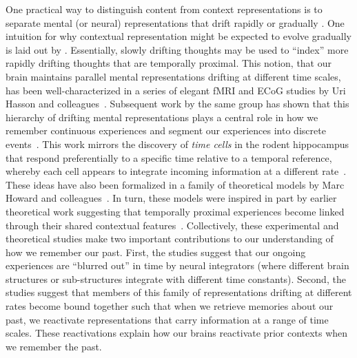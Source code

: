 \documentclass{article}
\begin{document}
One practical way to distinguish content from context representations is to separate mental (or neural) representations that drift rapidly \citep[content;][]{PolyEtal05, MannEtal12} or gradually \citep[context;][]{PolyEtal05, MannEtal11, HowaEtal12, FolkEtal18}.  One intuition for why contextual representation might be expected to evolve gradually is laid out by \cite{PolyKaha08}.  Essentially, slowly drifting thoughts may be used to ``index'' more rapidly drifting thoughts that are temporally proximal.  This notion, that our brain maintains parallel mental representations drifting at different time scales, has been well-characterized in a series of elegant fMRI and ECoG studies by Uri Hasson and colleagues~\citep{HassEtal08, LernEtal11, HoneEtal12}.  Subsequent work by the same group has shown that this hierarchy of drifting mental representations plays a central role in how we remember continuous experiences and segment our experiences into discrete events~\citep{BaldEtal17}. This work mirrors the discovery of \textit{time cells} in the rodent hippocampus that respond preferentially to a specific time relative to a temporal reference, whereby each cell appears to integrate incoming information at a different rate~\citep{PastEtal08, MacDEtal11}. These ideas have also been formalized in a family of theoretical models by Marc Howard and colleagues~\citep{HowaKaha02, SedeEtal08, PolyEtal09, ShanEtal09, ShanHowa10, ShanHowa12, HowaEtal14}.  In turn, these models were inspired in part by earlier theoretical work suggesting that temporally proximal experiences become linked through their shared contextual features~\citep{Este55a,AtkiShif68}.  Collectively, these experimental and theoretical studies make two important contributions to our understanding of how we remember our past.  First, the studies suggest that our ongoing experiences are ``blurred out'' in time by neural integrators (where different brain structures or sub-structures integrate with different time constants).  Second, the studies suggest that members of this family of representations drifting at different rates become bound together such that when we retrieve memories about our past, we reactivate representations that carry information at a range of time scales.  These reactivations explain how our brains reactivate prior contexts when we remember the past.
\end{document}
